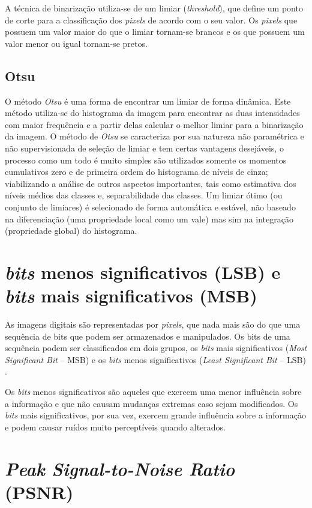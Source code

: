 A técnica de binarização utiliza-se de um limiar (\textit{threshold}), que define um ponto de corte para a classificação dos \textit{pixels} de acordo com o seu valor. Os \textit{pixels} que possuem um valor maior do que o limiar tornam-se brancos e os que possuem um valor menor ou igual tornam-se pretos.

\subsection{Otsu}

O método \textit{Otsu} é uma forma de encontrar um limiar de forma dinâmica. Este método utiliza-se do histograma da imagem para encontrar as duas intensidades com maior frequência e a partir delas calcular o melhor limiar para a binarização da imagem. O método de \textit{Otsu} se caracteriza por sua natureza não paramétrica e não supervisionada de seleção de limiar e tem certas vantagens desejáveis, o processo como um todo é muito simples são utilizados somente os momentos cumulativos zero e de primeira ordem do histograma de níveis de cinza; viabilizando a análise de outros aspectos importantes, tais como estimativa dos níveis médios das classes e, separabilidade das classes. Um limiar ótimo (ou conjunto de limiares) é selecionado de forma automática e estável, não baseado na diferenciação (uma propriedade local como um vale) mas sim na integração (propriedade global) do histograma. 

\section{\textit{bits} menos significativos (LSB) e \textit{bits} mais significativos (MSB)}

As imagens digitais são representadas por \textit{pixels}, que nada mais são do que uma sequência de bits que podem ser armazenados e manipulados. Os bits de uma sequência podem ser classificados em dois grupos, os \textit{bits} mais significativos (\textit{Most Significant Bit} – MSB) e os \textit{bits} menos significativos (\textit{Least Significant Bit} – LSB) \cite{Adonias2017}.

Os \textit{bits} menos significativos são aqueles que exercem uma menor influência sobre a informação e que não causam mudanças extremas caso sejam modificados. Os \textit{bits} mais significativos, por sua vez, exercem grande influência sobre a informação e podem causar ruídos muito perceptíveis quando alterados.

\section{\textit{Peak Signal-to-Noise Ratio} (PSNR)}

